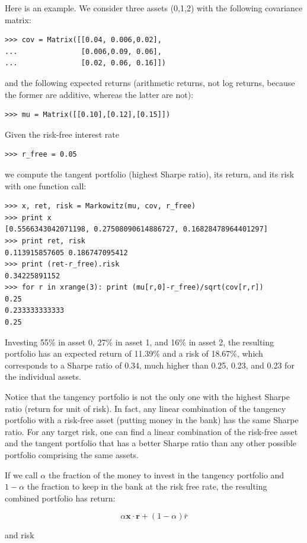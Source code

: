 \documentclass[justified,sixbynine]{tufte-book}
\theoremstyle{plain}%
\theoremstyle{definition}
\theoremstyle{remark}
\begin{document}
\begin{fullwidth}
Here is an example.
We consider three assets (0,1,2) with the following covariance matrix:
\begin{lstlisting}
>>> cov = Matrix([[0.04, 0.006,0.02],
...               [0.006,0.09, 0.06],
...               [0.02, 0.06, 0.16]])
\end{lstlisting}
and the following expected returns (arithmetic returns, not log returns, because the former are additive, whereas the latter are not):
\begin{lstlisting}
>>> mu = Matrix([[0.10],[0.12],[0.15]])
\end{lstlisting}
Given the risk-free interest rate
\begin{lstlisting}
>>> r_free = 0.05
\end{lstlisting}
we compute the tangent portfolio (highest Sharpe ratio), its return, and its risk with one function call:
\begin{lstlisting}
>>> x, ret, risk = Markowitz(mu, cov, r_free)
>>> print x
[0.5566343042071198, 0.27508090614886727, 0.16828478964401297]
>>> print ret, risk
0.113915857605 0.186747095412
>>> print (ret-r_free).risk
0.34225891152
>>> for r in xrange(3): print (mu[r,0]-r_free)/sqrt(cov[r,r])
0.25
0.233333333333
0.25
\end{lstlisting}

Investing 55\% in asset 0, 27\% in asset 1, and 16\% in asset 2, the resulting portfolio has an expected return of 11.39\% and a risk of 18.67\%, which corresponds to a Sharpe ratio of 0.34, much higher than 0.25, 0.23, and 0.23 for the individual assets.

Notice that the tangency portfolio is not the only one with the highest Sharpe ratio (return for unit of risk). In fact, any linear combination of the tangency portfolio with a risk-free asset (putting money in the bank) has the same Sharpe ratio. For any target risk, one can find a linear combination of the risk-free asset and the tangent portfolio that has a better Sharpe ratio than any other possible portfolio comprising the same assets.

If we call $\alpha$ the fraction of the money to invest in the tangency portfolio and $1-\alpha$ the fraction to keep in the bank at the risk free rate, the resulting combined portfolio has return:

\begin{equation}
\alpha \mathbf{x}\cdot\mathbf{r} + (1-\alpha) \bar r
\end{equation}

and risk


\end{fullwidth}
\end{document}
